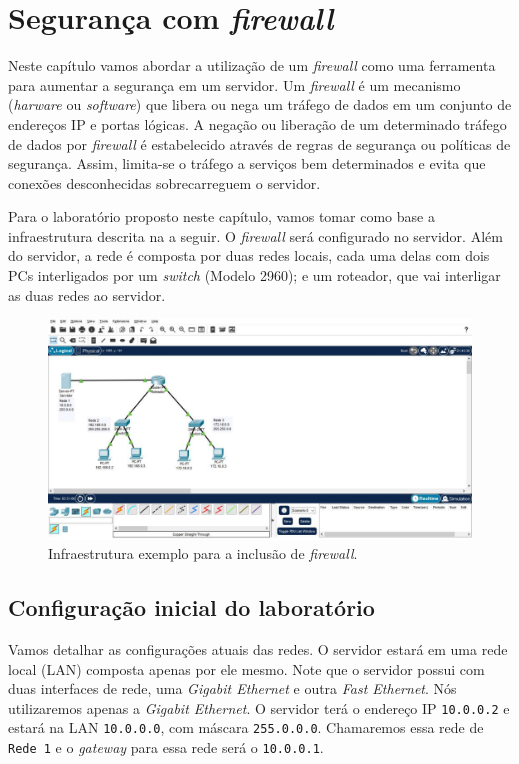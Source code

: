 \chapter{Segurança com \textit{firewall}}\label{chp:firewall}

Neste capítulo vamos abordar a utilização de um \textit{firewall} como uma ferramenta para aumentar a segurança em um servidor. Um \textit{firewall} é um mecanismo (\textit{harware} ou \textit{software}) que libera ou nega um tráfego de dados em um conjunto de endereços IP e portas lógicas. A negação ou liberação de um determinado tráfego de dados por \textit{firewall} é estabelecido através de regras de segurança ou políticas de segurança. Assim, limita-se o tráfego a serviços bem determinados e evita que conexões desconhecidas sobrecarreguem o servidor.

Para o laboratório proposto neste capítulo, vamos tomar como base a infraestrutura descrita na  a seguir. O \textit{firewall} será configurado no servidor. Além do servidor, a rede é composta por duas redes locais, cada uma delas com dois PCs interligados por um \textit{switch} (Modelo 2960); e um roteador, que vai interligar as duas redes ao servidor.

\begin{figure}[!hbt]
    \centering
    \includegraphics[width=.93\textwidth]{Figuras/firewallBase}
    \caption{Infraestrutura exemplo para a inclusão de \textit{firewall}.}\label{fig:firewallBase}
\end{figure}

\section{Configuração inicial do laboratório}\label{sec:configInicial}
Vamos detalhar as configurações atuais das redes. O servidor estará em uma rede local (LAN) composta apenas por ele mesmo. Note que o servidor possui com duas interfaces de rede, uma \textit{Gigabit Ethernet} e outra \textit{Fast Ethernet}. Nós utilizaremos apenas a \textit{Gigabit Ethernet}. O servidor terá o endereço IP \texttt{10.0.0.2} e estará na LAN \texttt{10.0.0.0}, com máscara \texttt{255.0.0.0}.  Chamaremos essa rede de \texttt{Rede 1} e o \textit{gateway} para essa rede será o \texttt{10.0.0.1}.

